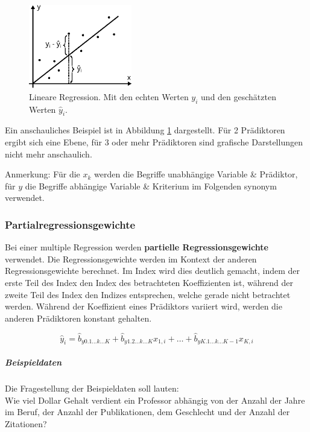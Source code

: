 \documentclass{article}
\numberwithin{equation}{section}
\begin{document}
\begin{figure}
  \centering
  \includegraphics[width=0.4\textwidth]{images/lin-reg.eps}
  \caption{Lineare Regression. Mit den echten Werten $y_i$ und den geschätzten Werten $\hat y_i$.}
  \label{img:lin-reg}
\end{figure}

Ein anschauliches Beispiel ist in Abbildung \ref{img:lin-reg} dargestellt. Für 2 Prädiktoren ergibt sich eine Ebene, für 3 oder mehr Prädiktoren sind grafische Darstellungen nicht mehr anschaulich.

Anmerkung: Für die $x_k$ werden die Begriffe unabhängige Variable \& Prädiktor, für $y$ die Begriffe abhängige Variable \& Kriterium im Folgenden synonym verwendet.

\subsubsection{Partialregressionsgewichte}

Bei einer multiple Regression werden \textbf{partielle Regressionsgewichte} verwendet. Die Regressionsgewichte werden im Kontext der anderen Regressionsgewichte berechnet. Im Index wird dies deutlich gemacht, indem der erste Teil des Index den Index des betrachteten Koeffizienten ist, während der zweite Teil des Index den Indizes entsprechen, welche gerade nicht betrachtet werden. Während der Koeffizient eines Prädiktors variiert wird, werden die anderen Prädiktoren konstant gehalten.

\begin{equation}
\hat y_i = \hat b_{y0.1 \dots k \dots K} + \hat b_{y1.2 \dots k \dots K} x_{1,i} + \dots + \hat b_{yK.1 \dots k \dots K-1} x_{K,i}
\end{equation}

\subparagraph{Beispieldaten}

Die Fragestellung der Beispieldaten soll lauten:\\
Wie viel Dollar Gehalt verdient ein Professor abhängig von der Anzahl der Jahre im Beruf, der Anzahl der Publikationen, dem Geschlecht und der Anzahl der Zitationen?
\end{document}
